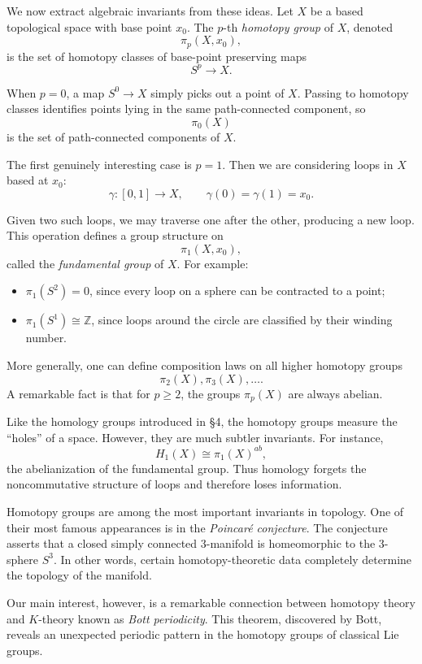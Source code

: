 \documentclass[12pt,reqno]{amsart}
\theoremstyle{plain}
\numberwithin{equation}{section}
\begin{document}
\medskip

We now extract algebraic invariants from these ideas. Let $X$ be a based topological space with base point $x_0$. The $p$-th \emph{homotopy group} of $X$, denoted
\[
\pi_p(X,x_0),
\]
is the set of homotopy classes of base-point preserving maps
\[
S^p\to X.
\]

When $p=0$, a map $S^0\to X$ simply picks out a point of $X$. Passing to homotopy classes identifies points lying in the same path-connected component, so
\[
\pi_0(X)
\]
is the set of path-connected components of $X$.

The first genuinely interesting case is $p=1$. Then we are considering loops in $X$ based at $x_0$:
\[
\gamma:[0,1]\to X,
\qquad
\gamma(0)=\gamma(1)=x_0.
\]

Given two such loops, we may traverse one after the other, producing a new loop. This operation defines a group structure on
\[
\pi_1(X,x_0),
\]
called the \emph{fundamental group} of $X$.
For example:

\begin{itemize}
    \item $\pi_1(S^2)=0$, since every loop on a sphere can be contracted to a point;
    \item $\pi_1(S^1)\cong \mathbb Z$, since loops around the circle are classified by their winding number.
\end{itemize}

More generally, one can define composition laws on all higher homotopy groups
\[
\pi_2(X),\pi_3(X),\dots.
\]
A remarkable fact is that for $p\ge2$, the groups $\pi_p(X)$ are always abelian.

\medskip

Like the homology groups introduced in \S 4, the homotopy groups measure the ``holes'' of a space. However, they are much subtler invariants. For instance,
\[
H_1(X)\cong \pi_1(X)^{ab},
\]
the abelianization of the fundamental group. Thus homology forgets the noncommutative structure of loops and therefore loses information.

Homotopy groups are among the most important invariants in topology. One of their most famous appearances is in the \emph{Poincar\'e conjecture}. The conjecture asserts that a closed simply connected $3$-manifold is homeomorphic to the $3$-sphere $S^3$. In other words, certain homotopy-theoretic data completely determine the topology of the manifold.

\medskip

Our main interest, however, is a remarkable connection between homotopy theory and $K$-theory known as \emph{Bott periodicity}. This theorem, discovered by Bott, reveals an unexpected periodic pattern in the homotopy groups of classical Lie groups.
\end{document}
